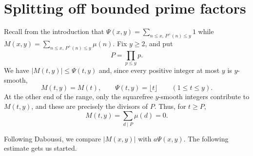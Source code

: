 \documentclass[11pt]{amsart}
\theoremstyle{remark}
\begin{document}
\section{Splitting off bounded prime factors}\label{sec:smooth}
Recall from the introduction that $\Psi(x,y)=\sum_{n\le x,\,P^{+}(n)\le y} 1$ while $M(x,y)=\sum_{n\le x,\,P^{+}(n)\le y} \mu(n)$. Fix $y\ge 2$, and put
\[
P=\prod_{p\le y}p.
\]
We have $|M(t,y)|\le\Psi(t,y)$ and, since every positive integer at
most $y$ is $y$-smooth,
\[
M(t,y)=M(t),\qquad \Psi(t,y)=\lfloor t\rfloor\qquad(1\le t\le y).
\]
At the other end of the range, only the squarefree $y$-smooth
integers contribute to $M(t,y)$, and these are precisely the
divisors of $P$. Thus, for $t\ge P$,
\begin{equation}\label{eq:support}
M(t,y)=\sum_{d\mid P}\mu(d)=0.
\end{equation}

Following Daboussi, we compare $|M(x,y)|$ with $a\Psi(x,y)$. The following estimate gets us started.
\end{document}
